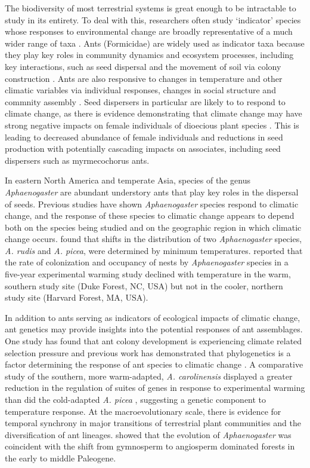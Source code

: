 \documentclass[fleqn,10pt,lineno]{wlpeerj} %
\begin{document}
The biodiversity of most terrestrial systems is great enough to be
intractable to study in its entirety. To deal with this, researchers
often study `indicator' species whose responses to environmental
change are broadly representative of a much wider range of taxa
\citep{Siddig2016}. Ants (Formicidae) are widely used as indicator
taxa \citep{Agosti2000} because they play key roles in community
dynamics and ecosystem processes, including key interactions, such as
seed dispersal and the movement of soil via colony construction
\citep{DelToro2012}. Ants are also responsive to changes in
temperature and other climatic variables via individual responses,
changes in social structure and commnity assembly \citep{Spicer2017,
  Diamond2017, Diamond2018}. Seed dispersers in particular are likely
to to respond to climate change, as there is evidence demonstrating
that climate change may have strong negative impacts on female
individuals of dioecious plant species \citep{Hultine2016}. This is
leading to decreased abundance of female individuals and reductions in
seed production with potentially cascading impacts on associates,
including seed dispersers such as myrmecochorus ants.

In eastern North America and temperate Asia, species of the genus
\textit{Aphaenogaster} are abundant understory ants that play key
roles in the dispersal of seeds. Previous studies have shown
\textit{Aphaenogaster} species respond to climatic change, and the
response of these species to climatic change appears to depend both on
the species being studied and on the geographic region in which
climatic change occurs. \cite{Warren2013} found that shifts in the
distribution of two \textit{Aphaenogaster} species, \textit{A. rudis}
and \textit{A. picea}, were determined by minimum
temperatures. \cite{Diamond2016} reported that the rate of
colonization and occupancy of nests by \textit{Aphaenogaster} species
in a five-year experimental warming study \citep{Pelini2014} declined
with temperature in the warm, southern study site (Duke Forest, NC,
USA) but not in the cooler, northern study site (Harvard Forest, MA,
USA).

In addition to ants serving as indicators of ecological impacts of
climatic change, ant genetics may provide insights into the potential
responses of ant assemblages. One study has found that ant colony
development is experiencing climate related selection pressure
\citep{Penick2017} and previous work has demonstrated that
phylogenetics is a factor determining the response of ant species to
climatic change \citep{Diamond2012a}. A comparative study of the
southern, more warm-adapted, \textit{A. carolinensis} displayed a
greater reduction in the regulation of suites of genes in response to
experimental warming than did the cold-adapted \textit{A. picea}
\citep{Stanton-Geddes}, suggesting a genetic component to temperature
response. At the macroevolutionary scale, there is evidence for
temporal synchrony in major transitions of terrestrial plant
communities and the diversification of ant lineages. \cite{Moreau2006}
showed that the evolution of \textit{Aphaenogaster} was coincident
with the shift from gymnosperm to angiosperm dominated forests in the
early to middle Paleogene.
\end{document}
